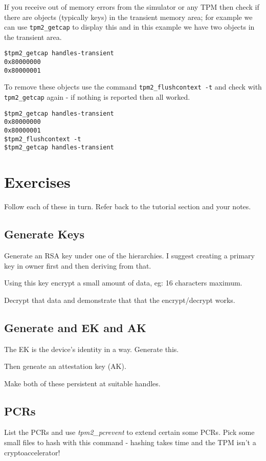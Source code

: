 \documentclass[11pt,a4paper]{article}
\begin{document}
If you receive out of memory errors from the simulator or any TPM then check if there are objects (typically keys) in the transient memory area; for example we can use \texttt{tpm2\_getcap} to display this and in this example we have two objects in the transient area.

\begin{verbatim}
$tpm2_getcap handles-transient
0x80000000
0x80000001
\end{verbatim}

To remove these objects use the command \texttt{tpm2\_flushcontext -t} and check with \texttt{tpm2\_getcap} again - if nothing is reported then all worked.

\begin{verbatim}
$tpm2_getcap handles-transient
0x80000000
0x80000001
$tpm2_flushcontext -t
$tpm2_getcap handles-transient
\end{verbatim}

\section{Exercises}
Follow each of these in turn. Refer back to the tutorial section and your notes.

\subsection{Generate Keys}
Generate an RSA key under one of the hierarchies. I suggest creating a primary key in owner first and then deriving from that.

Using this key encrypt a small amount of data, eg: 16 characters maximum.

Decrypt that data and demonstrate that that the encrypt/decrypt works.

\subsection{Generate and EK and AK}
The EK is the device's identity in a way. Generate this.

Then geneate an attestation key (AK).

Make both of these persistent at suitable handles.

\subsection{PCRs}\label{pcrs}
List the PCRs and use \textit{tpm2\_pcrevent} to extend certain some PCRs.  Pick some small files to hash with this command - hashing takes time and the TPM isn't a cryptoaccelerator!
\end{document}
